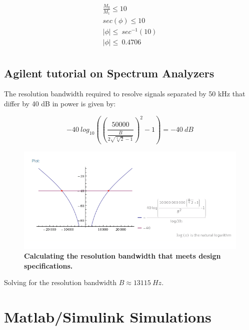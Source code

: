 \documentclass[letterpaper,12pt]{article}
\begin{document}
\begin{equation}
\begin{split}
\frac{M_{0}}{M_{1}}\leq10 \\
sec(\phi)\leq10 \\
|\phi|\leq\ sec^{-1}(10) \\
|\phi|\leq\ 0.4706 \\
\end{split}
\end{equation}

\subsection{Agilent tutorial on Spectrum Analyzers}

The resolution bandwidth required to resolve signals separated by 50 kHz that
differ by 40 dB in power is given by:

\begin{equation}
-40\ log_{10}\left(\left(\frac{50000}{\frac{B}{2\sqrt{\sqrt[4]{2}-1}}}\right)^2 - 1\right) = -40\ dB
\end{equation}

\begin{figure}[hbtp]
\includegraphics[width=1.0\columnwidth]{prelab1-figure4}
\caption{
\label{fig:prelab1-figure4}
{\bf Calculating the resolution bandwidth that meets design specifications.
}
}
\end{figure}

Solving for the resolution bandwidth $B\approx13115\ Hz$.
\pagebreak

\section{Matlab/Simulink Simulations}
\end{document}
